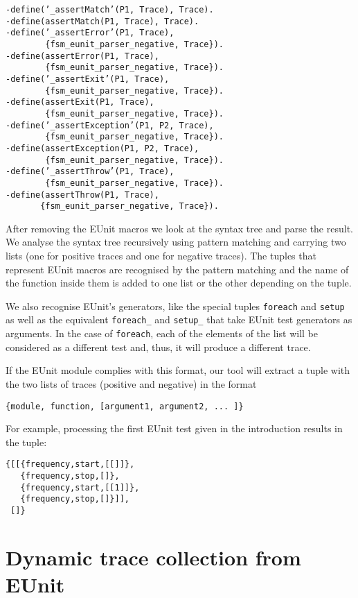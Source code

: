 \documentclass[]{sigplanconf}
\begin{document}
\begin{verbatim}
-define(’_assertMatch’(P1, Trace), Trace). 
-define(assertMatch(P1, Trace), Trace).
-define(’_assertError’(P1, Trace), 
        {fsm_eunit_parser_negative, Trace}).
-define(assertError(P1, Trace), 
        {fsm_eunit_parser_negative, Trace}).
-define(’_assertExit’(P1, Trace),
        {fsm_eunit_parser_negative, Trace}).
-define(assertExit(P1, Trace), 
        {fsm_eunit_parser_negative, Trace}).
-define(’_assertException’(P1, P2, Trace), 
        {fsm_eunit_parser_negative, Trace}).
-define(assertException(P1, P2, Trace), 
        {fsm_eunit_parser_negative, Trace}).
-define(’_assertThrow’(P1, Trace), 
        {fsm_eunit_parser_negative, Trace}).
-define(assertThrow(P1, Trace), 
       {fsm_eunit_parser_negative, Trace}).
\end{verbatim}

After removing the EUnit macros we look at the syntax tree and parse the result. We analyse the syntax tree recursively using pattern matching and carrying two lists (one for positive traces and one for negative traces). The tuples that represent EUnit macros are recognised by the pattern matching and the name of the function inside them is added to one list or the other depending on the tuple.


We also recognise EUnit's generators, like the special tuples \texttt{foreach} and
\texttt{setup} as well as the equivalent \texttt{foreach\_}
and \texttt{setup\_} that take EUnit test generators as arguments. In the case of \texttt{foreach},
each of the elements of the list will be considered as a different test
and, thus, it will produce a different trace.


If the EUnit module complies with this format, our tool will extract
a tuple with the two lists of traces (positive and negative) in the format
\begin{verbatim}
{module, function, [argument1, argument2, ... ]}
\end{verbatim}
For example, processing the first EUnit test given in the introduction results in the tuple:
\begin{verbatim}
{[[{frequency,start,[[]]},
   {frequency,stop,[]},
   {frequency,start,[[1]]},
   {frequency,stop,[]}]],
 []}
\end{verbatim}

\section{Dynamic trace collection from EUnit}
\label{dynamic-collection}
\end{document}
